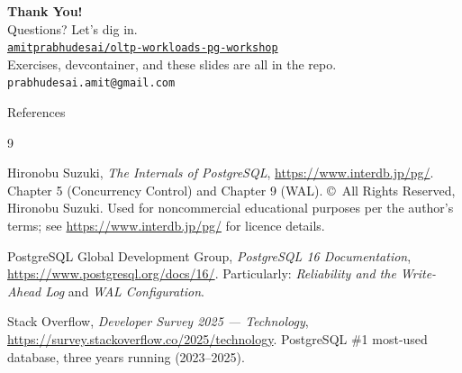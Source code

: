 \documentclass[aspectratio=169,10pt]{beamer}
\begin{document}
\begin{frame}[standout]
  \begin{center}
    {\Large \textbf{Thank You!}}\\[0.8em]

    {\normalsize Questions? Let's dig in.}\\[1.2em]

    \href{https://github.com/amitprabhudesai/oltp-workloads-pg-workshop}{%
      \faGithub\enspace\texttt{amitprabhudesai/oltp-workloads-pg-workshop}}\\[0.5em]

    {\small Exercises, devcontainer, and these slides are all in the repo.}\\[0.8em]

    \faEnvelope\enspace\texttt{prabhudesai.amit@gmail.com}
  \end{center}
\end{frame}

\begin{frame}{References}
  \begin{thebibliography}{9}

      Hironobu Suzuki,
      \textit{The Internals of PostgreSQL},
      \url{https://www.interdb.jp/pg/}.
      Chapter 5 (Concurrency Control) and Chapter 9 (WAL).
      \copyright\ All Rights Reserved, Hironobu Suzuki.
      Used for noncommercial educational purposes per the author's terms;
      see \url{https://www.interdb.jp/pg/} for licence details.

      PostgreSQL Global Development Group,
      \textit{PostgreSQL 16 Documentation},
      \url{https://www.postgresql.org/docs/16/}.
      Particularly: \textit{Reliability and the Write-Ahead Log}
      and \textit{WAL Configuration}.

      Stack Overflow,
      \textit{Developer Survey 2025 --- Technology},
      \url{https://survey.stackoverflow.co/2025/technology}.
      PostgreSQL \#1 most-used database, three years running (2023--2025).

  \end{thebibliography}
\end{frame}
\end{document}
